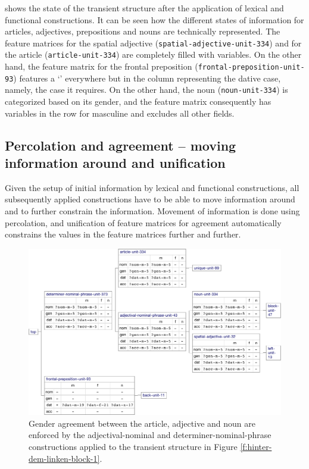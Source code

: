  shows the state of the
transient structure after the application of lexical and functional
constructions. It can be seen how the different states of information
for articles, adjectives, prepositions and nouns are technically
represented. The feature matrices for the spatial adjective
({\footnotesize\texttt{spatial-adjective-unit-334}}) and for the article
({\footnotesize\texttt{article-unit-334}}) are completely filled with variables. On
the other hand, the feature matrix for the frontal preposition
({\footnotesize\texttt{frontal-preposition-unit-93}}) features a `{\textminus}' everywhere but
in the column representing the dative case, namely, the case it
requires. On the other hand, the noun ({\footnotesize\texttt{noun-unit-334}}) is
categorized based on its gender, and the feature matrix consequently
has variables in the row for masculine and excludes all other fields.

\subsection{Percolation and agreement -- moving information around and unification}
Given the setup of initial information by lexical and functional
constructions, all subsequently applied constructions have to be able
to move information around and to further constrain the
information. Movement of information is done using percolation, and
unification of feature matrices for agreement automatically constrains
the values in the feature matrices further and further.

\begin{figure}[t]
  \centerline{\includegraphics[scale=0.5]{figs/hinter-dem-linken-block-2}}
  \caption[Gender agreement represented in the transient structure]{%
  Gender agreement 
  between the article, adjective and noun
  are enforced by the adjectival-nominal and
  determiner-nominal-phrase constructions applied to the transient
  structure in Figure \ref{f:hinter-dem-linken-block-1}. }
  \label{f:hinter-dem-linken-block-2}
\end{figure}

